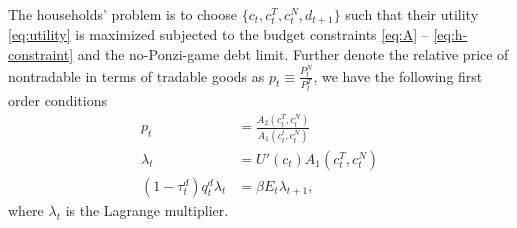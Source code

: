 The households' problem is to choose $\{c_t, c_t^T, c_t^N, d_{t+1}\}$ such that their utility \eqref{eq:utility} is maximized subjected to the budget constraints \eqref{eq:A} -- \eqref{eq:h-constraint} and the no-Ponzi-game debt limit.
Further denote the relative price of nontradable in terms of tradable goods as $p_t \equiv \frac{P^N_t}{P^T_t}$, we have the following first order conditions
\begin{subequations}
    \begin{align}
        p_t &= \frac{A_2(c_t^T, c_t^N)}{A_1(c_t^t, c_t^N)}\\
        \lambda_t &= U'(c_t)A_1(c_t^T, c_t^N)\\
        (1-\tau_t^d)q_t^d \lambda_t &= \beta E_t \lambda_{t+1},
    \end{align}
\end{subequations}
where $\lambda_t$ is the Lagrange multiplier.